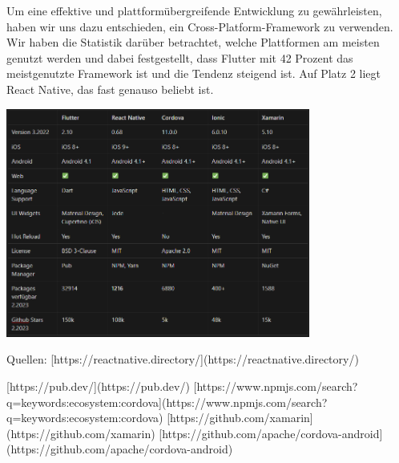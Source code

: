 Um eine effektive und plattformübergreifende Entwicklung zu gewährleisten, haben wir uns dazu entschieden, ein Cross-Platform-Framework zu verwenden. Wir haben die Statistik darüber betrachtet, welche Plattformen am meisten genutzt werden und dabei festgestellt, dass Flutter mit 42 Prozent das meistgenutzte Framework ist und die Tendenz steigend ist. Auf Platz 2 liegt React Native, das fast genauso beliebt ist.

\includegraphics[width=0.75\textwidth]{pics/temp-table.png}


Quellen:
[https://reactnative.directory/](https://reactnative.directory/)

[https://pub.dev/](https://pub.dev/)
[https://www.npmjs.com/search?q=keywords:ecosystem:cordova](https://www.npmjs.com/search?q=keywords:ecosystem:cordova)
[https://github.com/xamarin](https://github.com/xamarin)
[https://github.com/apache/cordova-android](https://github.com/apache/cordova-android)

